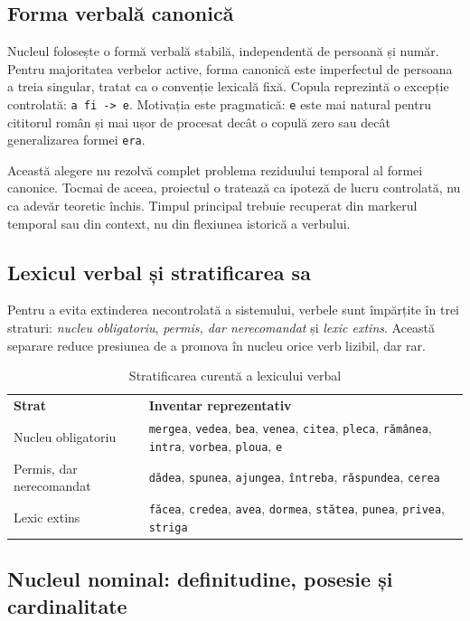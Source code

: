\documentclass[12pt,onecolumn,letterpaper]{article}
\newcommand{\rs}[1]{\texttt{#1}}
\newcommand{\RStablelayout}{%
\footnotesize
\setlength{\tabcolsep}{6pt}%
\renewcommand{\arraystretch}{1.12}%
\arrayrulecolor{RSRule}%
}
\begin{document}
\subsection{Forma verbală canonică}

Nucleul folosește o formă verbală stabilă, independentă de persoană și număr.
Pentru majoritatea verbelor active, forma canonică este imperfectul de persoana
a treia singular, tratat ca o convenție lexicală fixă. Copula reprezintă o
excepție controlată: \rs{a fi -> e}. Motivația este pragmatică: \rs{e} este mai
natural pentru cititorul român și mai ușor de procesat decât o copulă zero sau
decât generalizarea formei \rs{era}.

Această alegere nu rezolvă complet problema reziduului temporal al formei
canonice. Tocmai de aceea, proiectul o tratează ca ipoteză de lucru controlată,
nu ca adevăr teoretic închis. Timpul principal trebuie recuperat din markerul
temporal sau din context, nu din flexiunea istorică a verbului.

\subsection{Lexicul verbal și stratificarea sa}

Pentru a evita extinderea necontrolată a sistemului, verbele sunt împărțite în
trei straturi: \textit{nucleu obligatoriu}, \textit{permis, dar nerecomandat} și
\textit{lexic extins}. Această separare reduce presiunea de a promova în nucleu
orice verb lizibil, dar rar.

\begin{table}[h!]
\centering
\RStablelayout
\begin{tabularx}{\linewidth}{@{}lY@{}}
\textbf{Strat} & \textbf{Inventar reprezentativ} \\
Nucleu obligatoriu & \rs{mergea}, \rs{vedea}, \rs{bea}, \rs{venea}, \rs{citea}, \rs{pleca}, \rs{rămânea}, \rs{intra}, \rs{vorbea}, \rs{ploua}, \rs{e} \\
Permis, dar nerecomandat & \rs{dădea}, \rs{spunea}, \rs{ajungea}, \rs{întreba}, \rs{răspundea}, \rs{cerea} \\
Lexic extins & \rs{făcea}, \rs{credea}, \rs{avea}, \rs{dormea}, \rs{stătea}, \rs{punea}, \rs{privea}, \rs{striga} \\
\bottomrule
\end{tabularx}
\caption{Stratificarea curentă a lexicului verbal}
\end{table}

\subsection{Nucleul nominal: definitudine, posesie și cardinalitate}
\end{document}
